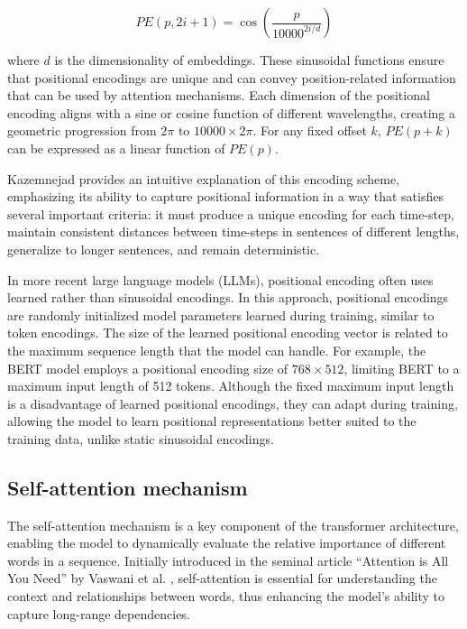 \begin{equation}
    PE(p, 2i + 1) = \cos\left(\frac{p}{10000^{2i/d}}\right)
\end{equation}

where \( d \) is the dimensionality of embeddings. These sinusoidal functions ensure that positional encodings are unique and can convey position-related information that can be used by attention mechanisms. Each dimension of the positional encoding aligns with a sine or cosine function of different wavelengths, creating a geometric progression from \( 2\pi \) to \( 10000 \times 2\pi \). For any fixed offset \( k \), \( PE(p+k) \) can be expressed as a linear function of \( PE(p) \).

Kazemnejad \cite{kazemnejad2019:pencoding} provides an intuitive explanation of this encoding scheme, emphasizing its ability to capture positional information in a way that satisfies several important criteria: it must produce a unique encoding for each time-step, maintain consistent distances between time-steps in sentences of different lengths, generalize to longer sentences, and remain deterministic.

In more recent large language models (LLMs), positional encoding often uses learned rather than sinusoidal encodings. In this approach, positional encodings are randomly initialized model parameters learned during training, similar to token encodings. The size of the learned positional encoding vector is related to the maximum sequence length that the model can handle. For example, the BERT model \cite{devlin2018bert} employs a positional encoding size of \( 768 \times 512 \), limiting BERT to a maximum input length of 512 tokens. Although the fixed maximum input length is a disadvantage of learned positional encodings, they can adapt during training, allowing the model to learn positional representations better suited to the training data, unlike static sinusoidal encodings.

\subsection{Self-attention mechanism}

The self-attention mechanism is a key component of the transformer architecture, enabling the model to dynamically evaluate the relative importance of different words in a sequence. Initially introduced in the seminal article “Attention is All You Need” by Vaswani et al. \cite{vaswani2017attention}, self-attention is essential for understanding the context and relationships between words, thus enhancing the model's ability to capture long-range dependencies.

